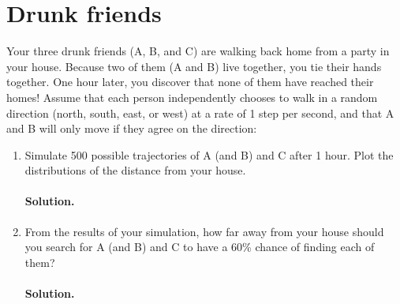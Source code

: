 \documentclass[a4paper, 12pt]{article}
\newcommand{\sol}[1]{\paragraph{Solution.} #1}
\newcommand{\task}[2]{
    \item #1 \sol{#2}
}
\begin{document}
\section{Drunk friends}
Your three drunk friends (A, B, and C) are walking back home from a party in your
house. Because two of them (A and B) live together, you tie their hands together. One
hour later, you discover that none of them have reached their homes! Assume that each
person independently chooses to walk in a random direction (north, south, east, or west)
at a rate of 1 step per second, and that A and B will only move if they agree on the direction:
\begin{enumerate}
    \task{Simulate 500 possible trajectories of A (and B) and C after 1 hour.
        Plot the distributions of the distance from your house.}
    {

    }
    \task{From the results of your simulation, how far away from your house should you search
        for A (and B) and C to have a 60\% chance of finding each of them?}
    {

    }
\end{enumerate}
\end{document}
